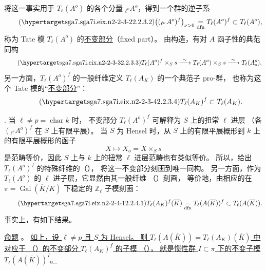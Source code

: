 将这一事实用于 $T_\ell(A^o)$ 的各个分量 ${}_{\ell^\nu}A^o$，得到一个群的逆子系
\begin{equation}\tag{\SGARefTarget{sga7.sga7i.eix.n2-2-3-2}{2.2.3.2}}
 \bigl(({}_{\ell^\nu}A^o)^f\bigr)_{\nu>0}
 \underset{\mathrm{dfn}}{=}T_\ell(A^o)^f
 \subset T_\ell(A^o),
\end{equation}
称为 Tate 模 $T_\ell(A^o)$ 的\underline{不变部分}（fixed part）。
由构造，有对 $A$ 函子性的典范同构
\begin{equation}\tag{\SGARefTarget{sga7.sga7i.eix.n2-2-3-3}{2.2.3.3}}
 T_\ell(A^o)^f\times_S s\xrightarrow{\ \sim\ }
 T_\ell(A^o)\times_Ss\xrightarrow{\ \sim\ }T_\ell(A_o^o).
\end{equation}
另一方面，$T_\ell(A^o)^f$ 的一般纤维定义 $T_\ell(A_K)$ 的一个典范子 pro-群，
也称为这个 Tate 模的“\underline{不变部分}”：
\begin{equation}\tag{\SGARefTarget{sga7.sga7i.eix.n2-2-3-4}{2.2.3.4}}
 T_\ell(A_K)^f\subset T_\ell(A_K).
\end{equation}

\medskip
\noindent
{}. 当 $\ell\ne p=\operatorname{char}k$ 时，
不变部分 $T_\ell(A^o)^f$ 可解释为 $S$ 上的扭常 $\ell$ 进层
（各 $({}_{\ell^\nu}A^o)^f$ 在 $S$ 上有限平展）。
当 $S$ 为 Hensel 时，从 $S$ 上的有限平展概形到 $k$ 上的有限平展概形的函子
\[
 X\longmapsto X_o=X\times_Ss
\]
是范畴等价，因此 $S$ 上与 $k$ 上的扭常 $\ell$ 进层范畴也有类似等价。
所以，给出 $T_\ell(A^o)^f$ 的特殊纤维的（），
将这一不变部分刻画到唯一同构。
另一方面，作为 $T_\ell(A^o)$ 的 $\ell$ 进子层，它显然由其一般纤维
（）刻画，
等价地，由相应的在 $\pi=\operatorname{Gal}(\overline K/K)$ 下稳定的 $\mathbb Z_\ell$ 子模刻画：
\begin{equation}\tag{\SGARefTarget{sga7.sga7i.eix.n2-2-4-1}{2.2.4.1}}
 T_\ell(A_K)^f(\overline K)
 \underset{\mathrm{dfn}}{=}T_\ell(A(\overline K))^f
 \subset T_\ell(A(\overline K)).
\end{equation}
事实上，有如下结果。

\medskip
\noindent
\underline{命题} 。
\underline{如上，设 $\ell\ne p$ 且 $S$ 为 Hensel。
则 $T_\ell(A(\overline K))=T_\ell(A_K)(\overline K)$ 中对应于
（）的不变部分 $T_\ell(A_K)^f$ 的子模
（），
就是惯性群 $I\subset\pi$ 下的不变子模 $T_\ell(A(\overline K))^I$。}


